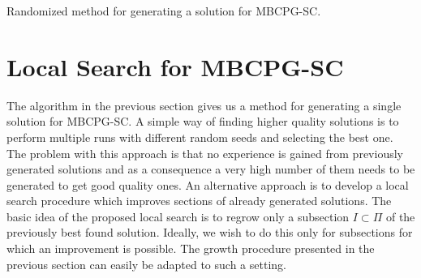 \begin{algorithm}
\begin{algorithmic}
\EndIf
\EndFor


\EndFor
\EndFor
\EndProcedure


\end{algorithmic}

\caption{\label{Alg:DeleteNode} Randomized method for generating a solution for MBCPG-SC.}
\end{algorithm}


\section{Local Search for MBCPG-SC}

The algorithm in the previous section gives us a method for generating a single solution for MBCPG-SC.  A simple way of finding higher quality solutions is to perform multiple runs with different random seeds and selecting the best one. The problem with this approach is that no experience is gained from previously generated solutions and as a consequence a very high number of them needs to be generated to get good quality ones. An alternative approach is to develop a local search procedure which improves sections of already generated solutions. The basic idea of the proposed local search is to regrow only a subsection $I \subset \Pi$ of the previously best found solution. Ideally, we wish to do this only  for  subsections for which an improvement is possible. The growth procedure presented in the previous section can easily be adapted to such a setting. 

